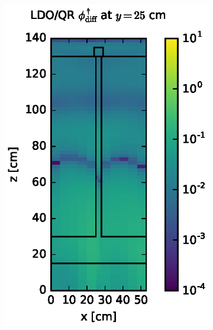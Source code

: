 \begin{figure}[!htb]
\centering
\begin{subfigure}{0.4\textwidth}
\includegraphics[max height=0.445\textheight]
{img/steel-plots/fwc-adj/flux-diff-rel-qr04.eps}
\end{subfigure} ~
\begin{subfigure}{0.4\textwidth}

\end{subfigure}
\end{figure}

